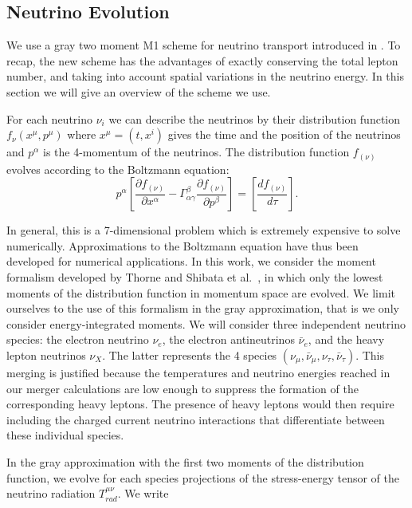\subsection{Neutrino Evolution}

We use a gray two moment M1 scheme for neutrino transport introduced in \cite{foucart2016impact}. To recap, the new scheme has the advantages of exactly conserving the total lepton number, and taking into account spatial variations in the neutrino energy. In this section we will give an overview of the scheme we use.

For each neutrino $\nu_i$ we can describe the neutrinos by their distribution function $f_{\nu}(x^\mu, p^\mu)$ where $x^\mu = (t, x^i)$ gives the time and the position of the neutrinos and $p^\alpha$ is the 4-momentum of the neutrinos. The distribution function $f_{(\nu)}$ evolves according to the Boltzmann equation:
\begin{equation}
  p^\alpha\left[ \frac{\partial f_{(\nu)}}{\partial x^\alpha} - \Gamma^\beta_{\alpha\gamma}\frac{\partial f_{(\nu)}}{\partial p^\beta}\right] = \left[\frac{df_{(\nu)}}{d\tau}\right].
\end{equation}

In general, this is a 7-dimensional problem which is extremely expensive to solve numerically. Approximations to the Boltzmann equation have thus been developed for numerical applications. In this work, we consider the moment formalism developed by Thorne \cite{1981mnras.194..439t} and Shibata et al.~\cite{shibata:11}, in which only the lowest moments of the distribution function in momentum space are evolved.  We limit ourselves to the use of this formalism in the gray approximation, that is we only consider energy-integrated moments.  We will consider three independent neutrino species: the electron neutrino $\nu_e$, the electron antineutrinos $\bar \nu_e$, and the heavy lepton neutrinos $\nu_X$. The latter represents the 4 species $(\nu_\mu, \bar \nu_\mu, \nu_\tau, \bar \nu_\tau)$. This merging is justified because the temperatures and neutrino energies reached in our merger calculations are low enough to suppress the formation of the corresponding heavy leptons. The presence of heavy leptons would then require including the charged current neutrino interactions that differentiate between these individual species.

In the gray approximation with the first two moments of the distribution function, we evolve for each species projections of the stress-energy tensor of the neutrino radiation $T^{\mu\nu}_{rad}$. We write

